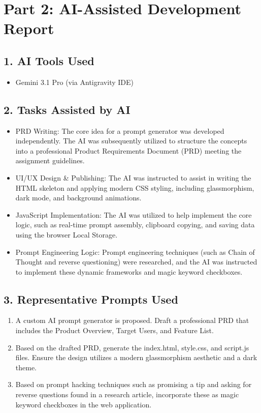 \documentclass[11pt]{article}
\begin{document}
\newpage

\section*{Part 2: AI-Assisted Development Report}

\subsection*{1. AI Tools Used}
\begin{itemize}[noitemsep]
    \item Gemini 3.1 Pro (via Antigravity IDE)
\end{itemize}

\subsection*{2. Tasks Assisted by AI}
\begin{itemize}[noitemsep]
    \item PRD Writing: The core idea for a prompt generator was developed independently. The AI was subsequently utilized to structure the concepts into a professional Product Requirements Document (PRD) meeting the assignment guidelines.
    \item UI/UX Design \& Publishing: The AI was instructed to assist in writing the HTML skeleton and applying modern CSS styling, including glassmorphism, dark mode, and background animations.
    \item JavaScript Implementation: The AI was utilized to help implement the core logic, such as real-time prompt assembly, clipboard copying, and saving data using the browser Local Storage.
    \item Prompt Engineering Logic: Prompt engineering techniques (such as Chain of Thought and reverse questioning) were researched, and the AI was instructed to implement these dynamic frameworks and magic keyword checkboxes.
\end{itemize}

\subsection*{3. Representative Prompts Used}
\begin{enumerate}[noitemsep]
    \item A custom AI prompt generator is proposed. Draft a professional PRD that includes the Product Overview, Target Users, and Feature List.
    \item Based on the drafted PRD, generate the index.html, style.css, and script.js files. Ensure the design utilizes a modern glassmorphism aesthetic and a dark theme.
    \item Based on prompt hacking techniques such as promising a tip and asking for reverse questions found in a research article, incorporate these as magic keyword checkboxes in the web application.
\end{enumerate}
\end{document}
